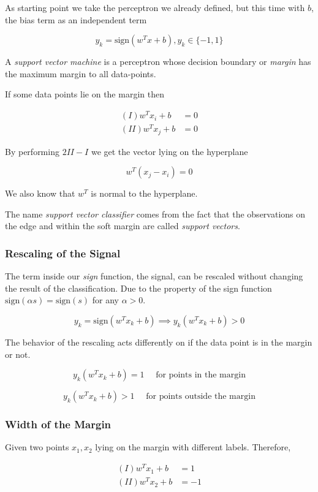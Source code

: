 As starting point we take the perceptron we already defined, but this time with \(b\), the bias term 
as an independent term 

\[
    y_k = \text{sign}(w^T x + b), y_k \in \{-1, 1\}
\]

A \emph{support vector machine} is a perceptron whose decision boundary or \emph{margin} has the maximum margin 
to all data-points.

If some data points lie on the margin then 

\begin{align*}
    (I)  w^T x_i + b &= 0 \\ 
    (II) w^T x_j + b &= 0
\end{align*}

By performing \(2II - I \) we get the vector lying on the hyperplane

\[
    w^T (x_j - x_i) = 0
\]

We also know that \(w^T\) is normal to the hyperplane.

The name \emph{support vector classifier} comes from the fact that the observations on the edge and within the soft margin 
are called \emph{support vectors}. 

\subsubsection{Rescaling of the Signal}

The term inside our \emph{sign} function, the signal, can be rescaled without changing the 
result of the classification. Due to the property of the sign function \(\text{sign}(\alpha s) = \text{sign}(s)\) 
for any \(\alpha > 0\). 

\[
    y_k = \text{sign}(w^T x_k + b) \implies y_k (w^T x_k + b) > 0
\]

The behavior of the rescaling acts differently on if the data point is in the margin or not. 

\[
    y_k(w^T x_k + b) = 1 \quad \text{ for points in the margin}
\]

\[
    y_k(w^T x_k + b) > 1 \quad \text{ for points outside the margin}
\]

\subsubsection{Width of the Margin}

Given two points \(x_1, x_2\) lying on the margin with different labels. Therefore,

\begin{align*}
    (I)  w^T x_1 + b &= 1 \\ 
    (II) w^T x_2 + b &= -1
\end{align*}

